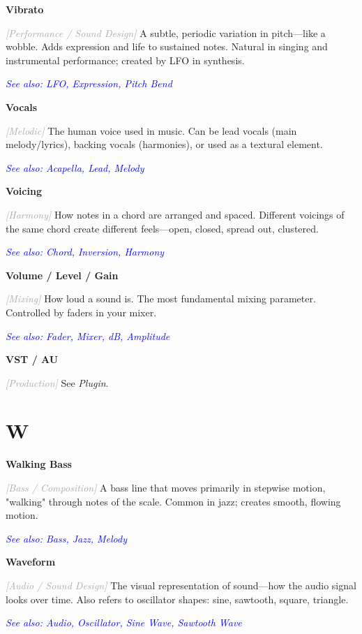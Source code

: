 \documentclass[11pt,letterpaper]{article}
\newcommand{\term}[1]{\textbf{\large\color{purple}#1}}
\newcommand{\category}[1]{\textcolor{darkgray}{\textit{\small [#1]}}}
\newcommand{\seealso}[1]{\textcolor{blue}{\textit{See also: #1}}}
\newenvironment{termdef}[1]
  {\noindent\term{#1}\par\nopagebreak}
  {\par\vspace{0.3em}}
\begin{document}
\begin{termdef}{Vibrato}
\category{Performance / Sound Design}
A subtle, periodic variation in pitch—like a wobble. Adds expression and life to sustained notes. Natural in singing and instrumental performance; created by LFO in synthesis.

\seealso{LFO, Expression, Pitch Bend}
\end{termdef}

\begin{termdef}{Vocals}
\category{Melodic}
The human voice used in music. Can be lead vocals (main melody/lyrics), backing vocals (harmonies), or used as a textural element.

\seealso{Acapella, Lead, Melody}
\end{termdef}

\begin{termdef}{Voicing}
\category{Harmony}
How notes in a chord are arranged and spaced. Different voicings of the same chord create different feels—open, closed, spread out, clustered.

\seealso{Chord, Inversion, Harmony}
\end{termdef}

\begin{termdef}{Volume / Level / Gain}
\category{Mixing}
How loud a sound is. The most fundamental mixing parameter. Controlled by faders in your mixer.

\seealso{Fader, Mixer, dB, Amplitude}
\end{termdef}

\begin{termdef}{VST / AU}
\category{Production}
See \textit{Plugin}.
\end{termdef}

\section*{W}

\begin{termdef}{Walking Bass}
\category{Bass / Composition}
A bass line that moves primarily in stepwise motion, "walking" through notes of the scale. Common in jazz; creates smooth, flowing motion.

\seealso{Bass, Jazz, Melody}
\end{termdef}

\begin{termdef}{Waveform}
\category{Audio / Sound Design}
The visual representation of sound—how the audio signal looks over time. Also refers to oscillator shapes: sine, sawtooth, square, triangle.

\seealso{Audio, Oscillator, Sine Wave, Sawtooth Wave}
\end{termdef}
\end{document}
